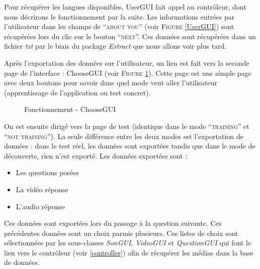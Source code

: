 Pour récupérer les langues disponibles, UserGUI fait appel au contrôleur, dont nous décrirons le fonctionnement par la suite.
Les informations entrées par l'utilisateur dans les champs de ``\textsc{about you}'' (voir \textsc{Figure} \ref{UserGUI}) sont récupérées lors du clic sur le bouton ``\textsc{next}''. Ces données sont récupérées dans un fichier \textit{txt} par le biais du package \textit{Extract} que nous allons voir plus tard.

Après l'exportation des données sur l'utilisateur, un lien est fait vers la seconde page de l'interface : ChooseGUI (voir \textsc{Figure} \ref{ChooseGUI}). Cette page est une simple page avec deux boutons pour savoir dans quel mode veut aller l'utilisateur (apprentissage de l'application ou test concret).


\begin{figure}[!ht]
\begin{center}
  \caption{Fonctionnement - ChooseGUI}
  \label{ChooseGUI} 
\end{center}
\end{figure}

On est ensuite dirigé vers la page de test (identique dans le mode ``\textsc{training}'' et ``\textsc{not training}''). La seule différence entre les deux modes est l'exportation de données : dans le test réel, les données sont exportées tandis que dans le mode de découverte, rien n'est exporté.
Les données exportées sont :
\begin{itemize}
 \item Les questions posées
 \item La vidéo réponse
 \item L'audio réponse
\end{itemize}
Ces données sont exportées lors du passage à la question suivante.
Ces précédentes données sont un choix parmis plusieurs. Ces listes de choix sont sélectionnées par les sous-classes \textit{SonGUI}, \textit{VideoGUI} et \textit{QuestionGUI} qui font le lien vers le contrôleur (voir \ref{controller}) afin de récupérer les médias dans la base de données.

